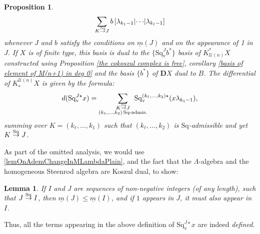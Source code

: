 \documentclass[11pt]{amsart} \renewcommand{\baselinestretch}{1.4}
\theoremstyle{plain}
\newtheorem{lem}[thm]{Lemma}
\newtheorem{prop}[thm]{Proposition}
\theoremstyle{definition}
\newcommand{\calU}{\mathcal{U}}
\newcommand{\minDimSq}{\underline{m}}
\newcommand{\produces}[3]{#3:#1\sim #2}
\renewcommand{\produces}[3]{#1\rightarrow_{#3} #2}%
\renewcommand{\produces}[3]{#1\overset{\smash{#3}}{\rightarrow} #2}%
\newcommand{\Sq}{\mathrm{Sq}}
\newcommand{\dver}{_\mathrm{v}}
\newcommand{\Sqv}{\mathrm{Sq}\dver}
\newcommand{\Sqvstar}[1]{\mathrm{Sq}\dver^{#1\star}}
\newcommand{\dual}{\mathbf{D}}
\begin{document}
\begin{Koszul complexes}
\begin{prop}
\[\sum_{\produces{K}{J}{\Sq}}b\left[\lambda_{k_1-1} \middle|\cdots\middle|\lambda_{k_\ell-1} \right]\]
whenever $J$ and $b$ satisfy the conditions on $\minDimSq(J)$ and on the appearance of 1 in $J$.
If $X$ is  of finite type, this basis is dual to the $\{\Sqv^Jb^*\}$ basis of $K^*_{\calU(n)}X$   constructed using Proposition \ref{the cokoszul complex is free}, corollary \ref{basis of element of M(n+1) in deg 0} and the basis $\{b^*\}$  of $\dual X$ dual to $B$. The differential of $K^{\calU(n)}_*X$ is given by the formula:
\[d(\Sqvstar{J}x)=\sum_{ \substack{\produces{K}{J}{\Sq}\\(k_{\ell},\ldots,k_2){\,\Sq\textup{-admis.}}}}\!\!\!\!\!\!\!\!\!\!\!\! \Sqvstar{(k_{\ell},\ldots,k_2)}(x\lambda_{k_1-1}),\]
summing over $K=(k_{\ell},\ldots,k_1)$ such that $(k_{\ell},\ldots,k_2)$ is $\Sq$-admissible %
and yet $\produces{K}{J}{\Sq}$.
\end{prop}
\noindent As part of the omitted analysis, we would use \ref{lemOnAdemChangeInMLambdaPlain}, and the fact that the $\Lambda$-algebra and the homogeneous Steenrod algebra are Koszul dual, to show:
\begin{lem}
If $I$ and $J$ are sequences of non-negative integers (of any length), such that $\produces{J}{I}{\Sq}$, then $\minDimSq(J)\leq\minDimSq(I)$, and if $1$ appears in $J$, it must also appear in $I$.
\end{lem}
\noindent Thus, all the terms appearing in the above definition of $\Sqvstar{J}x$ are indeed \emph{defined}.

\end{Koszul complexes}
\end{document}
